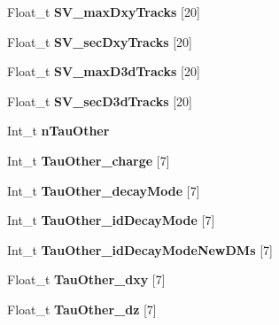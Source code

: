 \begin{DoxyCompactItemize}
\item 
\hypertarget{classMiniTree_af44619116459baf368093b7474550002}{}\label{classMiniTree_af44619116459baf368093b7474550002} 
Float\+\_\+t {\bfseries S\+V\+\_\+max\+Dxy\+Tracks} \mbox{[}20\mbox{]}
\item 
\hypertarget{classMiniTree_af5cc725dcd7e2df2121e9af01e36a745}{}\label{classMiniTree_af5cc725dcd7e2df2121e9af01e36a745} 
Float\+\_\+t {\bfseries S\+V\+\_\+sec\+Dxy\+Tracks} \mbox{[}20\mbox{]}
\item 
\hypertarget{classMiniTree_ad8f7f9c11573be0baed42bb8fae2d08e}{}\label{classMiniTree_ad8f7f9c11573be0baed42bb8fae2d08e} 
Float\+\_\+t {\bfseries S\+V\+\_\+max\+D3d\+Tracks} \mbox{[}20\mbox{]}
\item 
\hypertarget{classMiniTree_ab7eaf99a83d25a8ae79b930f237ddf64}{}\label{classMiniTree_ab7eaf99a83d25a8ae79b930f237ddf64} 
Float\+\_\+t {\bfseries S\+V\+\_\+sec\+D3d\+Tracks} \mbox{[}20\mbox{]}
\item 
\hypertarget{classMiniTree_ada18425b5d4ca80856fcc9b40eb68372}{}\label{classMiniTree_ada18425b5d4ca80856fcc9b40eb68372} 
Int\+\_\+t {\bfseries n\+Tau\+Other}
\item 
\hypertarget{classMiniTree_ac4e5bcf61eb0f5e066fdbbee8347f6c5}{}\label{classMiniTree_ac4e5bcf61eb0f5e066fdbbee8347f6c5} 
Int\+\_\+t {\bfseries Tau\+Other\+\_\+charge} \mbox{[}7\mbox{]}
\item 
\hypertarget{classMiniTree_a3c6f0b8d231e15acc3120fd920f2e230}{}\label{classMiniTree_a3c6f0b8d231e15acc3120fd920f2e230} 
Int\+\_\+t {\bfseries Tau\+Other\+\_\+decay\+Mode} \mbox{[}7\mbox{]}
\item 
\hypertarget{classMiniTree_a7c2b281f7c6779397b49b496e89f4459}{}\label{classMiniTree_a7c2b281f7c6779397b49b496e89f4459} 
Int\+\_\+t {\bfseries Tau\+Other\+\_\+id\+Decay\+Mode} \mbox{[}7\mbox{]}
\item 
\hypertarget{classMiniTree_a878f4e74ccadf1e4ea229da9fe52bb8d}{}\label{classMiniTree_a878f4e74ccadf1e4ea229da9fe52bb8d} 
Int\+\_\+t {\bfseries Tau\+Other\+\_\+id\+Decay\+Mode\+New\+D\+Ms} \mbox{[}7\mbox{]}
\item 
\hypertarget{classMiniTree_a3243c1fe6d8119ac6722e22e68d861ab}{}\label{classMiniTree_a3243c1fe6d8119ac6722e22e68d861ab} 
Float\+\_\+t {\bfseries Tau\+Other\+\_\+dxy} \mbox{[}7\mbox{]}
\item 
\hypertarget{classMiniTree_a8bcfd761b91fce7efe7a06e4c7a55852}{}\label{classMiniTree_a8bcfd761b91fce7efe7a06e4c7a55852} 
Float\+\_\+t {\bfseries Tau\+Other\+\_\+dz} \mbox{[}7\mbox{]}
\item 

\end{DoxyCompactItemize}
